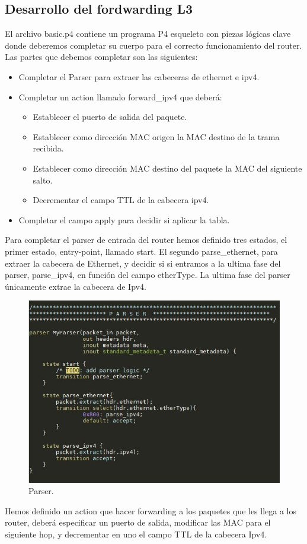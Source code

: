 \subsection{Desarrollo del fordwarding L3}
El archivo basic.p4 contiene un programa P4 esqueleto con piezas lógicas clave donde deberemos completar su cuerpo para el correcto funcionamiento del router. Las partes que debemos completar son las siguientes:
\begin{itemize}
    \item Completar el Parser para extraer las cabeceras de ethernet e ipv4.
    \item Completar un action llamado forward\_ipv4 que deberá: 
        \begin{itemize}
            \item Establecer el puerto de salida del paquete. 
            \item Establecer como dirección MAC origen la MAC destino de la trama recibida. 
            \item Establecer como dirección MAC destino del paquete la MAC del siguiente salto.
            \item Decrementar el campo TTL de la cabecera ipv4.
        \end{itemize}
    
    \item Completar el campo apply para decidir si aplicar la tabla.
\end{itemize}
\newpage
Para completar el parser de entrada del router hemos definido tres estados, el primer estado, entry-point, llamado start. El segundo parse\_ethernet, para extraer la cabecera de Ethernet, y decidir si si entramos a la ultima fase del parser, parse\_ipv4, en función del campo etherType. La ultima fase del parser únicamente extrae la cabecera de Ipv4. 
\begin{figure}[!htb]
  \centering
    \includegraphics[width=0.8\linewidth]{./img/test/2.JPG}
    \caption{Parser.}
  \label{fig:yo}
\end{figure}
\newline
Hemos definido un action que hacer forwarding a los paquetes que les llega a los router, deberá especificar un puerto de salida, modificar las MAC para el siguiente hop, y decrementar en uno el campo TTL de la cabecera Ipv4. \newline

